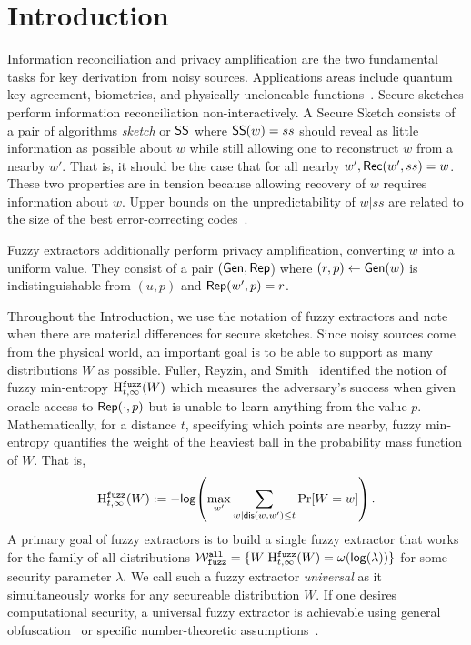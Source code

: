 
\section{Introduction}
Information reconciliation and privacy amplification are the two fundamental tasks for key derivation from noisy sources.  Applications areas include quantum key agreement, biometrics, and physically uncloneable functions~\cite{bennett1988privacy,dodis2008fuzzy}.  Secure sketches perform information reconciliation non-interactively.  A Secure Sketch consists of a pair of algorithms \emph{sketch} or ${\mathsf{SS}}$ where ${\mathsf{SS}}(w) = ss$ should reveal as little information as possible about $w$ while still allowing one to reconstruct $w$ from a nearby $w'$. That is, it should be the case that for all nearby $w', {\mathsf{Rec}}(w', ss) = w$.  These two properties are in tension because allowing recovery of $w$ requires information about $w$.  Upper bounds on the unpredictability of $w | ss$ are related to the size of the best error-correcting codes~\cite{dodis2008fuzzy,fuller2020computational}. 

  Fuzzy extractors additionally perform privacy amplification, converting $w$ into a uniform value.  They consist of a pair $({\mathsf{Gen}}, {\mathsf{Rep}}$) where $(r, p)\leftarrow {\ensuremath{\mathsf{Gen}}}(w)$ is indistinguishable from $(u, p)$ and ${\mathsf{Rep}}(w', p) =r$.

  Throughout the Introduction, we use the notation of fuzzy extractors
  and note when there are material differences for secure sketches.
  Since noisy sources come from the physical world, an important goal
  is to be able to support as many distributions $W$ as possible.
  Fuller, Reyzin, and Smith~\cite{fuller2016fuzzy,fuller2020fuzzy}
  identified the notion of fuzzy min-entropy $\mathrm{H}^{\mathtt{fuzz}}_{t,\infty}(W)$ which
  measures the adversary's success when given oracle access to
  ${\mathsf{Rep}}(\cdot, p)$ but is unable to learn anything from the value $p$.
  Mathematically, for a distance $t$, specifying which points are
  nearby, fuzzy min-entropy quantifies the weight of the heaviest ball
  in the probability mass function of $W$.  That is,
\[
\mathrm{H}^{\mathtt{fuzz}}_{t,\infty}(W):= -\mathsf{log}\!\left(\max_{w'} \sum_{w | \mathsf{dis}(w, w')\le t} \Pr[W=w]\right).
\]A primary goal of fuzzy extractors is to build a single fuzzy extractor that works for the family of all distributions $\mathcal{W}_{\mathtt{fuzz}}^{\mathtt{all}} = \{ W | \mathrm{H}^{\mathtt{fuzz}}_{t,\infty}(W) = \omega(\mathsf{log}\!\left(\lambda\right))\}$ for some security parameter $\lambda$.  We call such a fuzzy extractor \emph{universal} as it simultaneously works for any secureable distribution $W$. 
If one desires computational security, a universal fuzzy extractor is achievable using general obfuscation~\cite{BarakBCKPS13,BitanskyCKP14,bitansky2017virtual} or specific number-theoretic assumptions~\cite{galbraith2019obfuscated}. 


